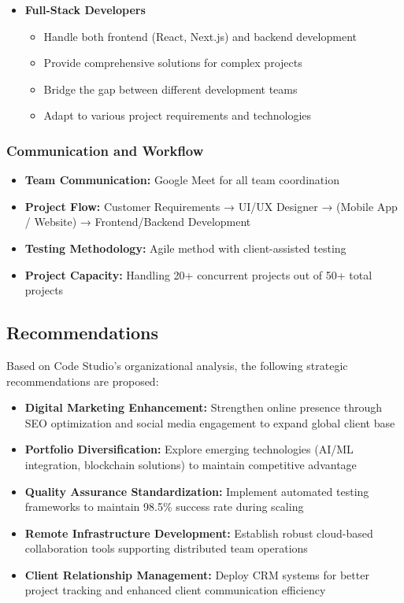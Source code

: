 \documentclass[12pt,a4paper]{article}
\begin{document}
\begin{itemize}
    \item \textbf{Full-Stack Developers}
    \begin{itemize}
        \item Handle both frontend (React, Next.js) and backend development
        \item Provide comprehensive solutions for complex projects
        \item Bridge the gap between different development teams
        \item Adapt to various project requirements and technologies
    \end{itemize}
\end{itemize}

\subsubsection{Communication and Workflow}
\begin{itemize}
    \item \textbf{Team Communication:} Google Meet for all team coordination
    \item \textbf{Project Flow:} Customer Requirements → UI/UX Designer → (Mobile App / Website) → Frontend/Backend Development
    \item \textbf{Testing Methodology:} Agile method with client-assisted testing
    \item \textbf{Project Capacity:} Handling 20+ concurrent projects out of 50+ total projects
\end{itemize}

\subsection{Recommendations}

Based on Code Studio's organizational analysis, the following strategic recommendations are proposed:

\begin{itemize}
    \item \textbf{Digital Marketing Enhancement:} Strengthen online presence through SEO optimization and social media engagement to expand global client base
    \item \textbf{Portfolio Diversification:} Explore emerging technologies (AI/ML integration, blockchain solutions) to maintain competitive advantage
    \item \textbf{Quality Assurance Standardization:} Implement automated testing frameworks to maintain 98.5\% success rate during scaling
    \item \textbf{Remote Infrastructure Development:} Establish robust cloud-based collaboration tools supporting distributed team operations
    \item \textbf{Client Relationship Management:} Deploy CRM systems for better project tracking and enhanced client communication efficiency
\end{itemize}
\end{document}
